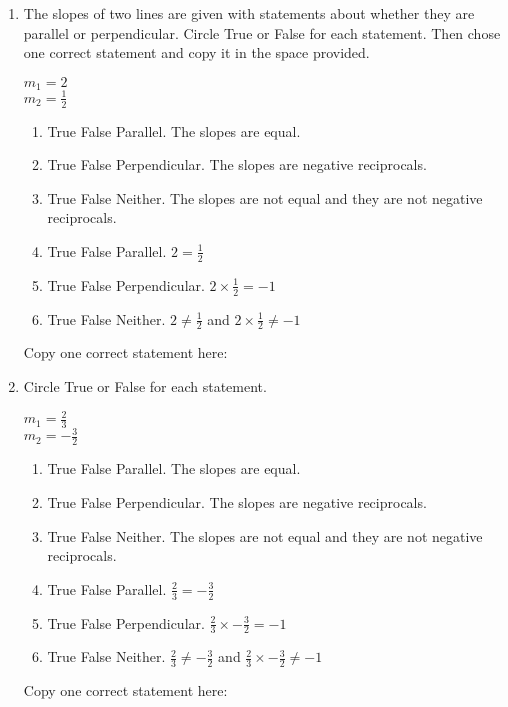 \documentclass[12pt, twoside]{article}
\begin{document}
\begin{enumerate}
\newpage
  \item The slopes of two lines are given with statements about whether they are parallel or perpendicular. Circle True or False for each statement. Then chose one correct statement and copy it in the space provided.
  \begin{multicols}{2}
    $\displaystyle m_1=2$ \\
    $\displaystyle m_2=\frac{1}{2}$
  \end{multicols}
    \begin{enumerate}[leftmargin=!,labelindent=-0.5cm,itemindent=-2.9cm,itemsep=0.25cm]
      \item True \quad False \quad Parallel. The slopes are equal.
      \item True \quad False \quad Perpendicular. The slopes are  negative reciprocals.
      \item True \quad False \quad Neither. The slopes are not equal and they are not negative reciprocals.
      \item True \quad False \quad Parallel. $\displaystyle 2= \frac{1}{2}$
      \item True \quad False \quad Perpendicular. $\displaystyle 2 \times \frac{1}{2}= -1$
      \item True \quad False \quad Neither. $\displaystyle 2 \neq \frac{1}{2}$ and $\displaystyle 2 \times \frac{1}{2} \neq -1$
    \end{enumerate}
    Copy one correct statement here: \vspace{2cm}
  \item Circle True or False for each statement.
  \begin{multicols}{2}
    $\displaystyle m_1=\frac{2}{3}$ \\
    $\displaystyle m_2=-\frac{3}{2}$
  \end{multicols}
    \begin{enumerate}[leftmargin=!,labelindent=-0.5cm,itemindent=-2.9cm,itemsep=0.25cm]
      \item True \quad False \quad Parallel. The slopes are equal.
      \item True \quad False \quad Perpendicular. The slopes are  negative reciprocals.
      \item True \quad False \quad Neither. The slopes are not equal and they are not negative reciprocals.
      \item True \quad False \quad Parallel. $\displaystyle \frac{2}{3}=-\frac{3}{2}$
      \item True \quad False \quad Perpendicular. $\displaystyle \frac{2}{3} \times -\frac{3}{2}= -1$
      \item True \quad False \quad Neither. $\displaystyle \frac{2}{3} \neq -\frac{3}{2}$ and $\displaystyle \frac{2}{3} \times -\frac{3}{2} \neq -1$
    \end{enumerate}
    Copy one correct statement here:


\end{enumerate}
\end{document}
